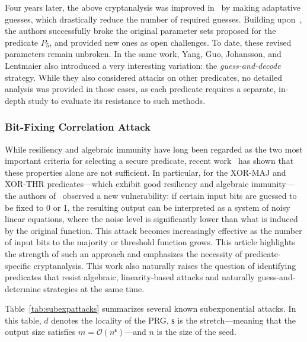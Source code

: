 \documentclass[journal=tosc,submission]{iacrtrans}
\theoremstyle{theorem}
\begin{document}
Four years later, the above cryptanalysis was improved in~\cite{DBLP:journals/tit/YangGJL22} by making adaptative guesses, which drastically reduce the number of required guesses. Building upon~\cite{AC:CDMRR18}, the authors successfully broke the original parameter sets proposed for the predicate $P_5$, and provided new ones as open challenges. To date, these revised parameters remain unbroken.
In the same work, Yang, Guo, Johansson, and Lentmaier also introduced a very interesting variation: the \emph{guess-and-decode} strategy. While they also considered attacks on other predicates, no detailed analysis was provided in those cases, as each predicate requires a separate, in-depth study to evaluate its resistance to such methods.


\subsubsection{Bit-Fixing Correlation Attack}

While resiliency and algebraic immunity have long been regarded as the two most important criteria for selecting a secure predicate, recent work~\cite{EPRINT:FLLL24} has shown that these properties alone are not sufficient. In particular, for the \textsf{XOR-MAJ} and \textsf{XOR-THR} predicates—which exhibit good resiliency and algebraic immunity—the authors of~\cite{EPRINT:FLLL24} observed a new vulnerability: if certain input bits are guessed to be fixed to 0 or 1, the resulting output can be interpreted as a system of noisy linear equations, where the noise level is significantly lower than what is induced by the original function.
This attack becomes increasingly effective as the number of input bits to the majority or threshold function grows. This article highlights the strength of such an approach and emphasizes the necessity of predicate-specific cryptanalysis. This work also naturally raises the question of identifying predicates that resist  algebraic, linearity-based attacks and naturally guess-and-determine strategies at the same time.

Table~\ref{tab:subexpattacks} summarizes several known subexponential attacks. In this table, $d$ denotes the locality of the PRG, $\mathsf{s}$ is the stretch—meaning that the output size satisfies $m = \mathcal{O}(n^{\mathsf{s}})$—and $n$ is the size of the seed.
\end{document}
